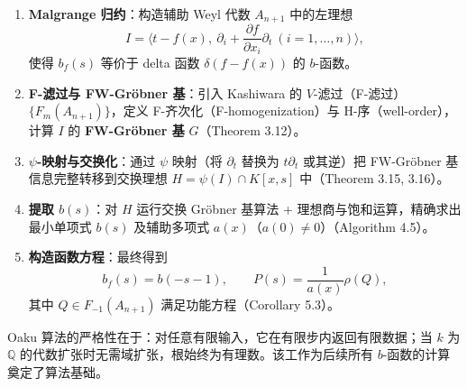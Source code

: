 \begin{enumerate}
    \item \textbf{Malgrange 归约}：构造辅助 Weyl 代数 \(A_{n+1}\) 中的左理想
          \[
              I = \bigl\langle t-f(x),\ \partial_i + \frac{\partial f}{\partial x_i}\partial_t \ (i=1,\dots,n)\bigr\rangle,
          \]
          使得 \(b_f(s)\) 等价于 delta 函数 \(\delta(f-f(x))\) 的 \(b\)-函数。

    \item \textbf{F-滤过与 FW-Gröbner 基}：引入 Kashiwara 的 \(V\)-滤过（F-滤过）\(\{F_m(A_{n+1})\}\)，定义 F-齐次化（F-homogenization）与 H-序（well-order），计算 \(I\) 的 \textbf{FW-Gröbner 基} \(G\)（Theorem 3.12）。

    \item \textbf{\(\psi\)-映射与交换化}：通过 \(\psi\) 映射（将 \(\partial_t\) 替换为 \(t\partial_t\) 或其逆）把 FW-Gröbner 基信息完整转移到交换理想 \(H = \psi(I) \cap K[x,s]\) 中（Theorem 3.15, 3.16）。

    \item \textbf{提取 \(b(s)\)}：对 \(H\) 运行交换 Gröbner 基算法 + 理想商与饱和运算，精确求出最小单项式 \(b(s)\) 及辅助多项式 \(a(x)\)（\(a(0)\ne0\)）（Algorithm 4.5）。

    \item \textbf{构造函数方程}：最终得到
          \[
              b_f(s) = b(-s-1),\qquad P(s) = \frac{1}{a(x)}\rho(Q),
          \]
          其中 \(Q\in F_{-1}(A_{n+1})\) 满足功能方程（Corollary 5.3）。
\end{enumerate}

Oaku 算法的严格性在于：对任意有限输入，它在有限步内返回有限数据；当 \(k\) 为 \(\mathbb{Q}\) 的代数扩张时无需域扩张，根始终为有理数。该工作为后续所有 \(b\)-函数的计算奠定了算法基础。

